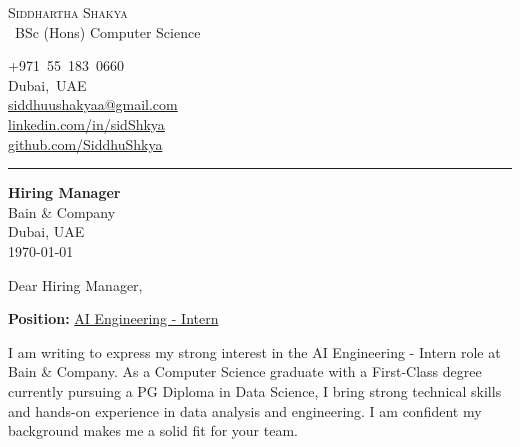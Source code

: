 \documentclass[12pt,a4paper]{article}
\newcommand{\jobrole}{AI Engineering - Intern}
\newcommand{\companyname}{Bain \& Company}
\begin{document}
\pagestyle{empty}

\begin{minipage}[b]{0.52\textwidth}
{\Huge\scshape\color{cvdarkblue} Siddhartha Shakya}\\ [1.5mm]
{\Large\color{gray} \faGraduationCap\  BSc (Hons) Computer Science}
\end{minipage}
\hfill
\begin{minipage}[b]{0.43\textwidth}
\RaggedLeft\small
\setlength{\baselineskip}{14pt}
\mbox{+971 55 183 0660}\\
\mbox{Dubai, UAE}\\
\mbox{\href{mailto:siddhuushakyaa@gmail.com}{siddhuushakyaa@gmail.com}}\\
\mbox{\href{https://linkedin.com/in/sidShkya}{linkedin.com/in/sidShkya}}\\
\mbox{\href{https://github.com/SiddhuShkya}{github.com/SiddhuShkya}}
\end{minipage}

\vspace{1mm}
{\color{cvteal}\rule{\linewidth}{1mm}} 
\vspace{2mm}

\begin{flushleft}
    \textbf{Hiring Manager} \\
    \companyname \\
    Dubai, UAE \\
    \vspace{1mm}
    \today
\end{flushleft}

\vspace{1mm}

Dear Hiring Manager,\\

\begin{center}{\textbf{Position:} \underline{\jobrole}}\end{center}

\justifying

I am writing to express my strong interest in the \jobrole{} role at \companyname. As a Computer Science graduate with a First-Class degree currently pursuing a PG Diploma in Data Science, I bring strong technical skills and hands-on experience in data analysis and engineering. I am confident my background makes me a solid fit for your team.
\end{document}
